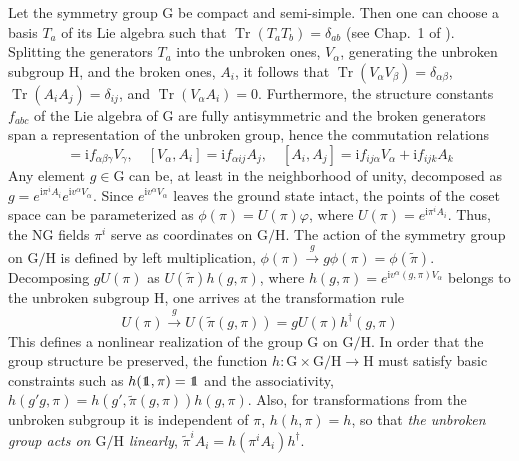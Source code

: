 \documentclass[final,3p,times,12pt,a4paper,sort&compress]{elsarticle}
\newcommand\gr[1]{\mathrm{#1}}              %
\newcommand\he[1]{#1^{\dagger}}             %
\newcommand\imag{\mathrm i}                 %
\DeclareRobustCommand\openone{\leavevmode\hbox{\small1\normalsize\kern-.33em1}}
\newcommand\vp{\varphi}
\DeclareMathOperator{\Tr}{Tr}
\begin{document}
Let the symmetry group $\gr G$ be compact and semi-simple. Then one can choose
a basis $T_a$ of its Lie algebra such that $\Tr(T_aT_b)=\delta_{ab}$
(see Chap.~1 of \cite{Barut:1977ba}). Splitting the generators $T_a$ into the
unbroken ones, $V_\alpha$, generating the unbroken subgroup $\gr H$, and the
broken ones, $A_i$, it follows that $\Tr(V_\alpha
V_\beta)=\delta_{\alpha\beta}$, $\Tr(A_iA_j)=\delta_{ij}$, and $\Tr(V_\alpha
A_i)=0$. Furthermore, the structure constants $f_{abc}$ of the Lie algebra of
$\gr G$ are fully antisymmetric and the broken generators span a representation
of the unbroken group, hence the commutation relations
\begin{equation}
[V_\alpha,V_\beta]=\imag f_{\alpha\beta\gamma}V_\gamma,\quad
[V_\alpha,A_i]=\imag f_{\alpha ij}A_j,\quad
[A_i,A_j]=\imag f_{ij\alpha}V_\alpha+\imag f_{ijk}A_k
\end{equation}
Any element $g\in\gr G$ can be, at least in the neighborhood of unity,
decomposed as $g=e^{\imag\pi^iA_i}e^{\imag v^\alpha V_\alpha}$. Since $e^{\imag
v^\alpha V_\alpha}$ leaves the ground state intact, the points of the coset
space can be parameterized as $\phi(\pi)=U(\pi)\vp$, where
$U(\pi)=e^{\imag\pi^iA_i}$. Thus, the NG fields $\pi^i$ serve as coordinates on
$\gr{G/H}$. The action of the symmetry group on $\gr{G/H}$ is defined by left
multiplication, $\phi(\pi)\xrightarrow{g}g\phi(\pi)=\phi(\tilde\pi)$.
Decomposing $gU(\pi)$ as $U(\tilde\pi)h(g,\pi)$, where $h(g,\pi)=e^{\imag
v^\alpha(g,\pi)V_\alpha}$ belongs to the unbroken subgroup $\gr H$, one arrives
at the transformation rule
\begin{equation}
U(\pi)\xrightarrow{g}U(\tilde\pi(g,\pi))=gU(\pi)\he h(g,\pi)
\label{coset_transfo}
\end{equation}
This defines a nonlinear realization of the group $\gr G$ on $\gr{G/H}$. In
order that the group structure be preserved, the function $h:\gr
G\times\gr{G/H}\to\gr H$ must satisfy basic constraints such as
$h(\openone,\pi)=\openone$ and the associativity,
$h(g'g,\pi)=h(g',\tilde\pi(g,\pi))h(g,\pi)$. Also, for transformations from the
unbroken subgroup it is independent of $\pi$, $h(h,\pi)=h$, so that \emph{the
unbroken group acts on $\gr{G/H}$ linearly}, $\tilde\pi^iA_i=h(\pi^iA_i)\he h$.
\end{document}
